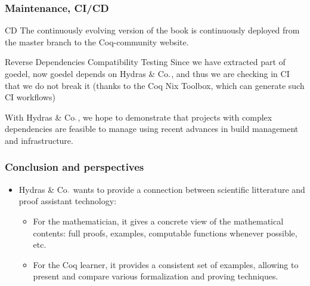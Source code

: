 \documentclass[10pt]{beamer}
\newcommand{\coq}{Coq\xspace}
\newcommand{\community}{Coq-community\xspace}
\newcommand{\Hydras}{Hydras \& Co$\text.$\xspace}
\begin{document}
\begin{frame}
  \frametitle{Maintenance, CI/CD}
  \begin{block}{CD}
    The continuously evolving version of the book is continuously deployed from the master branch to the \community website.
  \end{block}

  \begin{block}{Reverse Dependencies Compatibility Testing}
    Since we have extracted part of {\color{plugincolor}goedel}, now {\color{plugincolor}goedel} depends on {\color{plugincolor}\Hydras}, and thus we are checking in CI that we do not break it (thanks to the \textcolor{lookcolor}{Coq Nix Toolbox},
    which can generate such CI workflows)
  \end{block}

  \begin{block}{}
  {\color{lookcolor}  With \Hydras, we hope to demonstrate that projects with complex dependencies are feasible to manage using recent advances in build management and infrastructure.}
  \end{block}

\end{frame}


\begin{frame}
  \frametitle{Conclusion and perspectives}
  \begin{block}{}
    \begin{itemize}
    \item \Hydras wants to provide  a connection between scientific litterature and proof assistant technology:
      \begin{itemize}
      \item For the mathematician, it gives a concrete view of the mathematical contents: full proofs, examples, computable functions whenever possible, etc.
        \item  For the \coq learner, it provides a consistent set of examples,
allowing to present and compare various formalization and proving techniques.
      \end{itemize}
    \end{itemize}
  \end{block}
  \end{frame}

\end{document}
